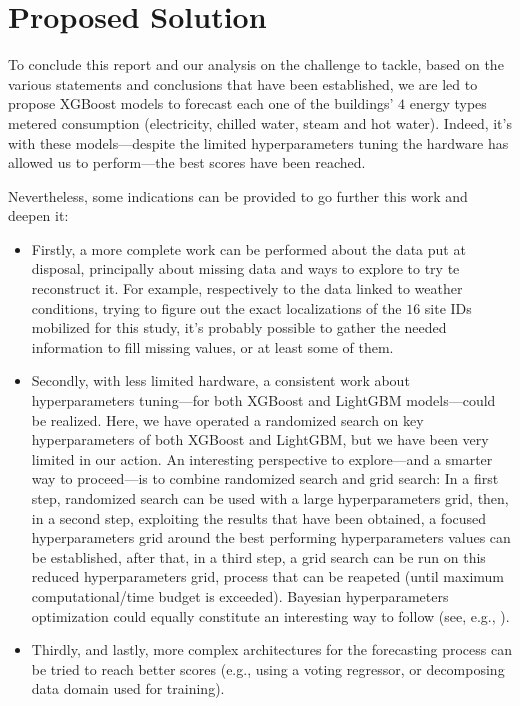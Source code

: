 \documentclass[twocolumn, switch]{article}
\begin{document}

\section{Proposed Solution}

To conclude this report and our analysis on the challenge to tackle, based on the various statements and conclusions that have been established, we are led to propose XGBoost models to forecast each one of the buildings' $4$ energy types metered consumption (electricity, chilled water, steam and hot water). Indeed, it's with these models---despite the limited hyperparameters tuning the hardware has allowed us to perform---the best scores have been reached.

Nevertheless, some indications can be provided to go further this work and deepen it:

\begin{itemize}
\item Firstly, a more complete work can be performed about the data put at disposal, principally about missing data and ways to explore to try te reconstruct it. For example, respectively to the data linked to weather conditions, trying to figure out the exact localizations of the $16$ site IDs mobilized for this study, it's probably possible to gather the needed information to fill missing values, or at least some of them.
\item Secondly, with less limited hardware, a consistent work about hyperparameters tuning---for both XGBoost and LightGBM models---could be realized. Here, we have operated a randomized search on key hyperparameters of both XGBoost and LightGBM, but we have been very limited in our action. An interesting perspective to explore---and a smarter way to proceed---is to combine randomized search and grid search: In a first step, randomized search can be used with a large hyperparameters grid, then, in a second step, exploiting the results that have been obtained, a focused hyperparameters grid around the best performing hyperparameters values can be established, after that, in a third step, a grid search can be run on this reduced hyperparameters grid, process that can be reapeted (until maximum computational/time budget is exceeded). Bayesian hyperparameters optimization could equally constitute an interesting way to follow (see, e.g., \cite{Bergstra_2013}).
\item Thirdly, and lastly, more complex architectures for the forecasting process can be tried to reach better scores (e.g., using a voting regressor, or decomposing data domain used for training).
\end{itemize}



\begin{normalsize}

\end{normalsize}


\end{document}
